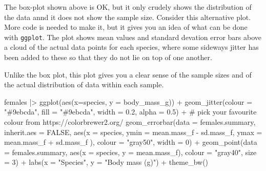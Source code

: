 \documentclass[
  letterpaper,
  DIV=11,
  numbers=noendperiod]{scrreprt}
\newenvironment{Shaded}{\begin{snugshade}}{\end{snugshade}}
\newcommand{\AttributeTok}[1]{\textcolor[rgb]{0.40,0.45,0.13}{#1}}
\newcommand{\CommentTok}[1]{\textcolor[rgb]{0.37,0.37,0.37}{#1}}
\newcommand{\ConstantTok}[1]{\textcolor[rgb]{0.56,0.35,0.01}{#1}}
\newcommand{\DecValTok}[1]{\textcolor[rgb]{0.68,0.00,0.00}{#1}}
\newcommand{\FloatTok}[1]{\textcolor[rgb]{0.68,0.00,0.00}{#1}}
\newcommand{\FunctionTok}[1]{\textcolor[rgb]{0.28,0.35,0.67}{#1}}
\newcommand{\NormalTok}[1]{\textcolor[rgb]{0.00,0.23,0.31}{#1}}
\newcommand{\SpecialCharTok}[1]{\textcolor[rgb]{0.37,0.37,0.37}{#1}}
\newcommand{\StringTok}[1]{\textcolor[rgb]{0.13,0.47,0.30}{#1}}
\begin{document}
\begin{tcolorbox}[enhanced jigsaw, colbacktitle=quarto-callout-note-color!10!white, leftrule=.75mm, titlerule=0mm, arc=.35mm, opacitybacktitle=0.6, left=2mm, bottomrule=.15mm, colframe=quarto-callout-note-color-frame, opacityback=0, rightrule=.15mm, colback=white, bottomtitle=1mm, toptitle=1mm, title=\textcolor{quarto-callout-note-color}{\faInfo}\hspace{0.5em}{Note}, toprule=.15mm, breakable, coltitle=black]

The box-plot shown above is OK, but it only crudely shows the
distribution of the data annd it does not show the sample size. Consider
this alternative plot. More code is needed to make it, but it gives you
an idea of what can be done with \texttt{ggplot}. The plot shows mean
values and standard devation error bars above a cloud of the actual data
points for each species, where some sideways jitter has been added to
these so that they do not lie on top of one another.

Unlike the box plot, this plot gives you a clear sense of the sample
sizes and of the actual distribution of data within each sample.

\begin{Shaded}
\begin{Highlighting}[]
\NormalTok{females  }\SpecialCharTok{|\textgreater{}}
  \FunctionTok{ggplot}\NormalTok{(}\FunctionTok{aes}\NormalTok{(}\AttributeTok{x=}\NormalTok{species, }\AttributeTok{y =}\NormalTok{ body\_mass\_g)) }\SpecialCharTok{+}
  \FunctionTok{geom\_jitter}\NormalTok{(}\AttributeTok{colour =} \StringTok{"\#9ebcda"}\NormalTok{, }\AttributeTok{fill =} \StringTok{"\#9ebcda"}\NormalTok{, }\AttributeTok{width =} \FloatTok{0.2}\NormalTok{, }\AttributeTok{alpha =} \FloatTok{0.5}\NormalTok{) }\SpecialCharTok{+}  \CommentTok{\# pick your favourite colour from https://colorbrewer2.org/}
  \FunctionTok{geom\_errorbar}\NormalTok{(}\AttributeTok{data =}\NormalTok{ females.summary,}
                \AttributeTok{inherit.aes =} \ConstantTok{FALSE}\NormalTok{,}
                \FunctionTok{aes}\NormalTok{(}\AttributeTok{x =}\NormalTok{ species, }\AttributeTok{ymin =}\NormalTok{ mean.mass\_f }\SpecialCharTok{{-}}\NormalTok{ sd.mass\_f, }\AttributeTok{ymax =}\NormalTok{ mean.mass\_f }\SpecialCharTok{+}\NormalTok{ sd.mass\_f ),}
                \AttributeTok{colour =} \StringTok{"gray50"}\NormalTok{,}
                \AttributeTok{width =} \DecValTok{0}\NormalTok{) }\SpecialCharTok{+}
  \FunctionTok{geom\_point}\NormalTok{(}\AttributeTok{data =}\NormalTok{ females.summary, }\FunctionTok{aes}\NormalTok{(}\AttributeTok{x =}\NormalTok{ species, }\AttributeTok{y =}\NormalTok{ mean.mass\_f), }\AttributeTok{colour =} \StringTok{"gray40"}\NormalTok{, }\AttributeTok{size =} \DecValTok{3}\NormalTok{) }\SpecialCharTok{+}
  \FunctionTok{labs}\NormalTok{(}\AttributeTok{x =} \StringTok{"Species"}\NormalTok{,}
       \AttributeTok{y =} \StringTok{"Body mass (g)"}\NormalTok{) }\SpecialCharTok{+}
  \FunctionTok{theme\_bw}\NormalTok{()}
\end{Highlighting}
\end{Shaded}


\end{tcolorbox}
\end{document}
